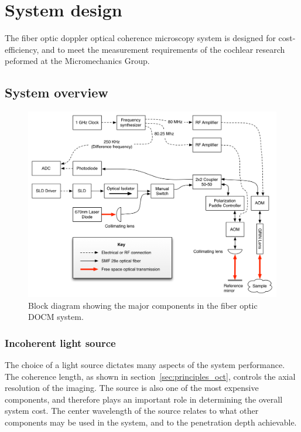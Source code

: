 \chapter{System design}

The fiber optic doppler optical coherence microscopy system is designed for cost-efficiency, and to meet the measurement requirements of the cochlear research peformed at the Micromechanics Group.

\section{System overview}

\begin{figure}[h!]
\centering
\includegraphics[width=1.1\textwidth]{Images/Background/actual_system_vertical.png}
\caption{Block diagram showing the major components in the fiber optic DOCM system.}
\end{figure}

\subsection{Incoherent light source}

The choice of a light source dictates many aspects of the system performance. The coherence length, as shown in section~\ref{sec:principles_oct}, controls the axial resolution of the imaging. The source is also one of the most expensive components, and therefore plays an important role in determining the overall system cost. The center wavelength of the source relates to what other components may be used in the system, and to the penetration depth achievable.

